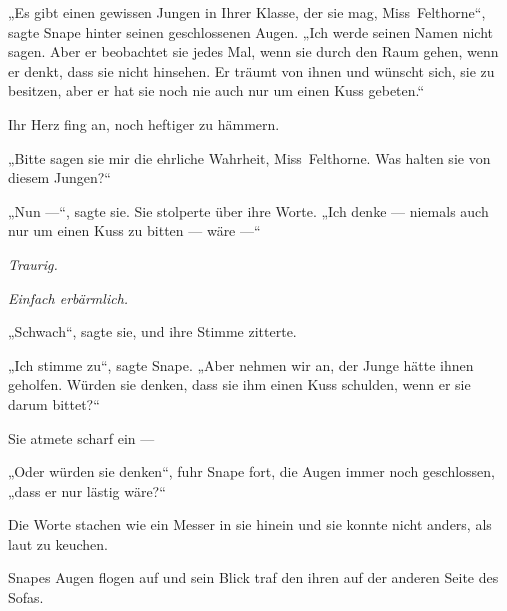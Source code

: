 „Es gibt einen gewissen Jungen in Ihrer Klasse, der sie mag, Miss~Felthorne“, sagte Snape hinter seinen geschlossenen Augen.
„Ich werde seinen Namen nicht sagen. Aber er beobachtet sie jedes Mal, wenn sie durch den Raum gehen, wenn er denkt, dass sie nicht hinsehen. Er träumt von ihnen und wünscht sich, sie zu besitzen, aber er hat sie noch nie auch nur um einen Kuss gebeten.“

Ihr Herz fing an, noch heftiger zu hämmern.

„Bitte sagen sie mir die ehrliche Wahrheit, Miss~Felthorne. Was halten sie von diesem Jungen?“

„Nun —“, sagte sie. Sie stolperte über ihre Worte.
„Ich denke — niemals auch nur um einen Kuss zu bitten — wäre —“

\emph{Traurig.}

\emph{Einfach erbärmlich.}

„Schwach“, sagte sie, und ihre Stimme zitterte.

„Ich stimme zu“, sagte Snape.
„Aber nehmen wir an, der Junge hätte ihnen geholfen. Würden sie denken, dass sie ihm einen Kuss schulden, wenn er sie darum bittet?“

Sie atmete scharf ein —

„Oder würden sie denken“, fuhr Snape fort, die Augen immer noch geschlossen, „dass er nur lästig wäre?“

Die Worte stachen wie ein Messer in sie hinein und sie konnte nicht anders, als laut zu keuchen.

Snapes Augen flogen auf und sein Blick traf den ihren auf der anderen Seite des Sofas.

